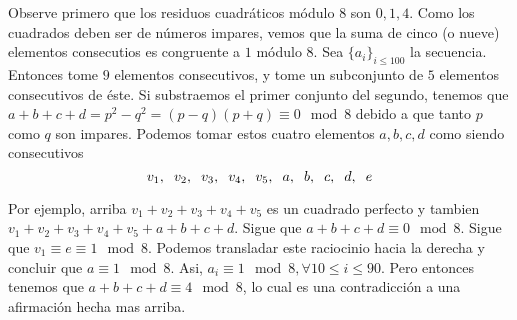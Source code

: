 \begin{sol}
	Observe primero que los residuos cuadr\'aticos m\'odulo $8$ son $0, 1, 4$. Como los cuadrados deben ser de n\'umeros impares, vemos que la suma de cinco (o nueve) elementos consecutios es congruente a $1$ m\'odulo $8$. Sea $\{a_{i}\}_{i \leq 100}$ la secuencia. Entonces tome $9$ elementos consecutivos, y tome un subconjunto de $5$ elementos consecutivos de \'este. Si substraemos el primer conjunto del segundo, tenemos que $a+b+c+d = p^2-q^2 = (p-q)(p+q) \equiv 0 \mod 8$ debido a que tanto $p$ como $q$ son impares. Podemos tomar estos cuatro elementos $a, b, c, d$ como siendo consecutivos
	\begin{equation}
	v_{1}, \hspace{0.2cm} v_{2}, \hspace{0.2cm} v_{3}, \hspace{0.2cm} v_{4}, \hspace{0.2cm} v_{5}, \hspace{0.2cm} a, \hspace{0.2cm} b, \hspace{0.2cm} c, \hspace{0.2cm} d, \hspace{0.2cm} e
	\end{equation}
	
	Por ejemplo, arriba $v_{1}+v_{2}+v_{3}+v_{4}+v_{5} $ es un cuadrado perfecto y tambien $v_{1}+v_{2}+v_{3}+v_{4}+v_{5} +a+b+c+d$. Sigue que $a+b+c+d \equiv 0 \mod 8$. Sigue que $v_{1} \equiv e \equiv 1 \mod 8$. Podemos transladar este raciocinio hacia la derecha y concluir que $a \equiv 1 \mod 8$. Asi, $a_{i} \equiv 1 \mod 8, \forall 10\leq i \leq 90$. Pero entonces tenemos que $a+b+c+d \equiv 4 \mod 8$, lo cual es una contradicci\'on a una afirmaci\'on hecha mas arriba.
\end{sol}

